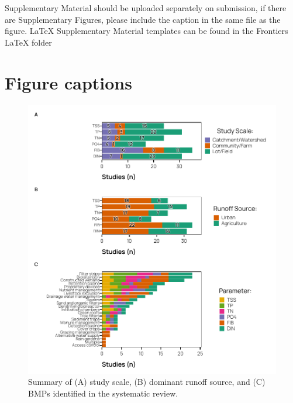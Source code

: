 \documentclass[utf8]{FrontiersinHarvard}
\begin{document}
Supplementary Material should be uploaded separately on submission, if there are
Supplementary Figures, please include the caption in the same file as the
figure. LaTeX Supplementary Material templates can be found in the Frontiers
LaTeX folder




\hypertarget{figure-captions}{%
\section*{Figure captions}\label{figure-captions}}

\begin{figure}
\includegraphics[width=1\linewidth,]{../figures/bmp_summary} \caption{Summary of (A) study scale, (B) dominant runoff source, and (C) BMPs identified in the systematic review.}\label{fig:bmpsummary}
\end{figure}
\end{document}
